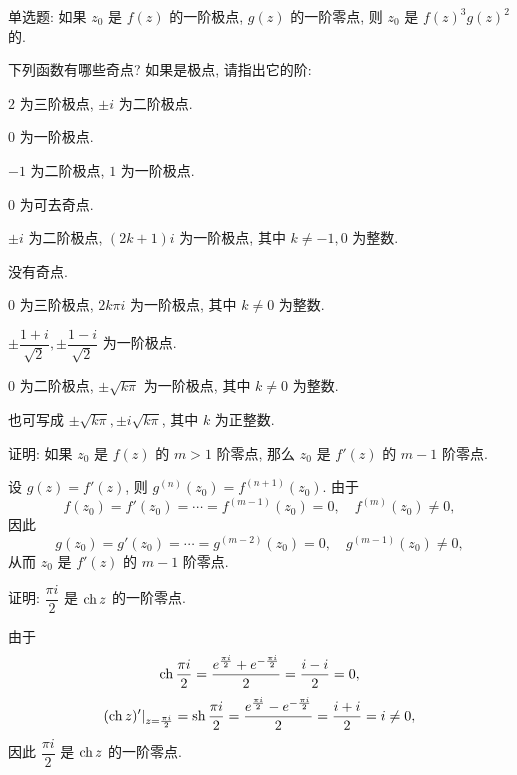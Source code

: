 \begin{exercise}
	单选题: 如果 $z_0$ 是 $f(z)$ 的一阶极点, $g(z)$ 的一阶零点, 则 $z_0$ 是 $f(z)^3g(z)^2$ 的.
\end{exercise}


\begin{exercise}[3]
	下列函数有哪些奇点? 如果是极点, 请指出它的阶:
\end{exercise}
\begin{solution}
	\subex $2$ 为三阶极点, $\pm i$ 为二阶极点.

	\subex $0$ 为一阶极点.

	\subex $-1$ 为二阶极点, $1$ 为一阶极点.

	\subex $0$ 为可去奇点.

	\subex $\pm i$ 为二阶极点, $(2k+1)i$ 为一阶极点, 其中 $k\neq -1,0$ 为整数.

	\subex 没有奇点.

	\subex $0$ 为三阶极点, $2k\pi i$ 为一阶极点, 其中 $k\neq0$ 为整数.

	\subex $\pm\dfrac{1+i}{\sqrt2},\pm\dfrac{1-i}{\sqrt2}$ 为一阶极点.

	\subex $0$ 为二阶极点, $\pm\sqrt{k\pi}$ 为一阶极点, 其中 $k\neq 0$ 为整数.

	也可写成 $\pm\sqrt{k\pi},\pm i\sqrt{k\pi}$, 其中 $k$ 为正整数.
\end{solution}


\begin{exercise}
	证明: 如果 $z_0$ 是 $f(z)$ 的 $m>1$ 阶零点, 那么 $z_0$ 是 $f'(z)$ 的 $m-1$ 阶零点.
\end{exercise}
\begin{solution}[证明]
	设 $g(z)=f'(z)$, 则 $g^{(n)}(z_0)=f^{(n+1)}(z_0)$.
	由于
	\[f(z_0)=f'(z_0)=\cdots=f^{(m-1)}(z_0)=0,\quad f^{(m)}(z_0)\neq 0,\]
	因此
	\[g(z_0)=g'(z_0)=\cdots=g^{(m-2)}(z_0)=0,\quad g^{(m-1)}(z_0)\neq 0,\]
	从而 $z_0$ 是 $f'(z)$ 的 $m-1$ 阶零点.
\end{solution}


\begin{exercise}
	证明: $\dfrac{\pi i}2$ 是 $\operatorname{ch} z$ 的一阶零点.
\end{exercise}
\begin{solution}[证明]
	由于
	\[\operatorname{ch}\frac{\pi i}2=\frac{e^{\frac{\pi i}2}+e^{-\frac{\pi i}2}}2
	=\frac{i-i}2=0,\]
	\[(\operatorname{ch} z)'|_{z=\frac{\pi i}2}=\operatorname{sh}\frac{\pi i}2=\frac{e^{\frac{\pi i}2}-e^{-\frac{\pi i}2}}2
	=\frac{i+i}2=i\neq 0,\]
	因此 $\dfrac{\pi i}2$ 是 $\operatorname{ch} z$ 的一阶零点.
\end{solution}



